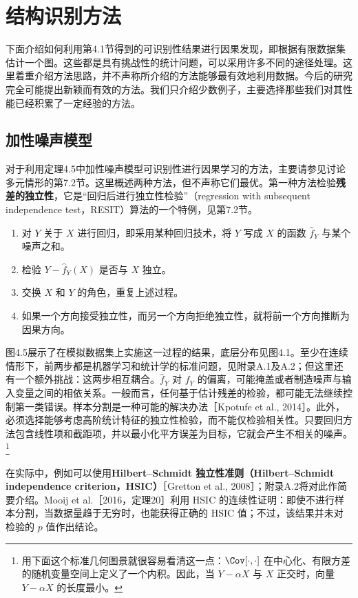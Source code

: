 \FloatBarrier
\section{结构识别方法}

下面介绍如何利用第4.1节得到的可识别性结果进行因果发现，即根据有限数据集估计一个图。这些都是具有挑战性的统计问题，可以采用许多不同的途径处理。这里着重介绍方法思路，并不声称所介绍的方法能够最有效地利用数据。今后的研究完全可能提出新颖而有效的方法。我们只介绍少数例子，主要选择那些我们对其性能已经积累了一定经验的方法。

\subsection{加性噪声模型}

对于利用定理4.5中加性噪声模型可识别性进行因果学习的方法，主要请参见讨论多元情形的第7.2节。这里概述两种方法，但不声称它们最优。第一种方法检验\textbf{残差的独立性}，它是“回归后进行独立性检验”（regression with subsequent independence test，RESIT）算法的一个特例，见第7.2节。
\begin{enumerate}
 \item 对 $Y$ 关于 $X$ 进行回归，即采用某种回归技术，将 $Y$ 写成 $X$ 的函数 $\widehat f_Y$ 与某个噪声之和。
 \item 检验 $Y-\widehat f_Y(X)$ 是否与 $X$ 独立。
 \item 交换 $X$ 和 $Y$ 的角色，重复上述过程。
 \item 如果一个方向接受独立性，而另一个方向拒绝独立性，就将前一个方向推断为因果方向。
\end{enumerate}



图4.5展示了在模拟数据集上实施这一过程的结果，底层分布见图4.1。至少在连续情形下，前两步都是机器学习和统计学的标准问题，见附录A.1及A.2；但这里还有一个额外挑战：这两步相互耦合。$\widehat f_Y$ 对 $f_Y$ 的偏离，可能掩盖或者制造噪声与输入变量之间的相依关系。一般而言，任何基于估计残差的检验，都可能无法继续控制第一类错误。样本分割是一种可能的解决办法［Kpotufe et al., 2014］。此外，必须选择能够考虑高阶统计特征的独立性检验，而不能仅检验相关性。只要回归方法包含线性项和截距项，并以最小化平方误差为目标，它就会产生不相关的噪声。\footnote{用下面这个标准几何图景就很容易看清这一点：$\Cov[\cdot,\cdot]$ 在中心化、有限方差的随机变量空间上定义了一个内积。因此，当 $Y-\alpha X$ 与 $X$ 正交时，向量 $Y-\alpha X$ 的长度最小。}

在实际中，例如可以使用\textbf{Hilbert--Schmidt 独立性准则（Hilbert--Schmidt independence criterion，HSIC）}［Gretton et al., 2008］；附录A.2将对此作简要介绍。Mooij et al.［2016，定理20］利用 HSIC 的连续性证明：即使不进行样本分割，当数据量趋于无穷时，也能获得正确的 HSIC 值；不过，该结果并未对检验的 $p$ 值作出结论。

